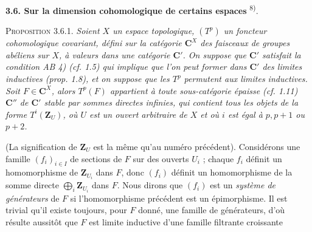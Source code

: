 \indent\textbf{3.6. Sur la dimension cohomologique de certains espaces}%
\textsuperscript{8)}.

\indent\textsc{Proposition 3.6.1.} \textit{Soient $X$ un espace
topologique, $(T^p)$ un foncteur cohomologique covariant, défini sur la
catégorie $\mathbf C^X$ des faisceaux de groupes abéliens sur $X$, à valeurs dans une
catégorie $\mathbf C'$. On suppose que $\mathbf C'$ satisfait la condition \textup{AB 4)} \textup{(}cf. \textup{1.5)} qui
implique que l'on peut former dans $\mathbf C'$ des limites inductives \textup{(}prop. \textup{1.8)}, et
on suppose que les $T^p$ permutent aux limites inductives. Soit $F\in \mathbf C^X$,
alors $T^p(F)$ appartient à toute sous-catégorie épaisse \textup{(}cf. \textup{1.11)} $\mathbf C''$ de
$\mathbf C'$ stable par sommes directes infinies, qui contient tous les objets de la
forme $T^i(\mathbf Z_U)$, où $U$ est un ouvert arbitraire de $X$ et où $i$ est égal à
$p,p+1$ ou $p+2$.}

(La signification de $\mathbf Z_U$ est la même qu'au numéro précédent).
Considérons une famille $(f_i)_{i\in I}$ de sections de $F$ sur des ouverts
$U_i$ ; chaque $f_i$ définit un homomorphisme de $\mathbf Z_{U_i}$ dans $F$, donc
$(f_i)$ définit un homomorphisme de la
somme directe $\displaystyle\bigoplus_i \mathbf Z_{U_i}$ dans $F$.
Nous dirons que $(f_i)$ est un \textit{système de générateurs} de $F$ si
l'homomorphisme précédent est un épimorphisme. Il est trivial qu'il existe
toujours, pour $F$ donné, une famille de générateurs, d'où résulte aussitôt que
$F$ est limite inductive d'une famille filtrante croissante

